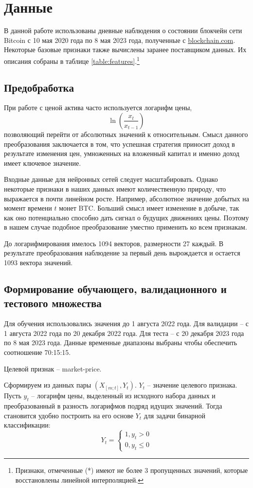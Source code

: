 \documentclass[diploma]{nanolab2015}
\begin{document}
\section{Данные}
В данной работе использованы дневные наблюдения о состоянии блокчейн сети Bitcoin с 10 мая 2020 года по 8 мая 2023 года, полученные с \href{https://www.blockchain.com/explorer/charts}{blockchain.com}. Некоторые базовые признаки также вычислены заранее поставщиком данных. Их описания собраны в таблице \ref{table:features}.\footnote{Признаки, отмеченные (*) имеют не более 3 пропущенных значений, которые восстановлены линейной интерполяцией.}

\subsection{Предобработка}
При работе с ценой актива часто используется логарифм цены,
$$
    \ln\left(\frac{x_{t}}{x_{t-1}}\right)
$$
позволяющий перейти от абсолютных значений к относительным. Смысл данного преобразования заключается в том, что успешная стратегия приносит доход в результате изменения цен, умноженных на вложенный капитал и именно доход имеет ключевое значение.

Входные данные для нейронных сетей следует масштабировать. Однако некоторые признаки в наших данных имеют количественную природу, что выражается в почти линейном росте. Например, абсолютное значение добытых на момент времени $t$ монет BTC. Больший смысл имеет изменение в добыче, так как оно потенциально способно дать сигнал о будущих движениях цены. Поэтому в нашем случае подобное преобразование уместно применить ко всем признакам.

До логарифмирования имелось 1094 векторов, размерности 27 каждый. В результате преобразования наблюдение за первый день вырождается и остается 1093 вектора значений.

\subsection{Формирование обучающего, валидационного и тестового множества}
Для обучения использовались значения до 1 августа 2022 года. Для валидации -- с 1 августа 2022 года по 20 декабря 2022 года. Для теста -- с 20 декабря 2023 года по 8 мая 2023 года. Данные временные диапазоны выбраны чтобы обеспечить соотношение 70:15:15.

Целевой признак -- market-price.

Сформируем из данных пары $(X_{[m;t]}, Y_{t})$. $Y_t$ -- значение целевого признака. Пусть $y_t$ -- логарифм цены, выделенный из исходного набора данных и преобразованный в разность логарифмов подряд идущих значений. Тогда становится удобно построить на его основе $Y_t$ для задачи бинарной классификации:
$$
    Y_t =
    \begin{cases}
        1, y_t > 0 \\
        0, y_t \le 0
    \end{cases}
$$
\end{document}
